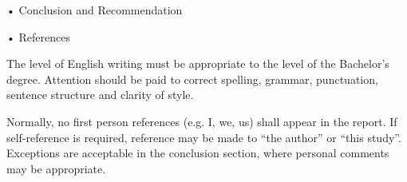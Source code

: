 \documentclass[12pt, a4paper]{report}
\begin{document}
{\begin{flushleft}
{				•	Conclusion and Recommendation
				
				•	References
				
				The level of English writing must be appropriate to the level of the Bachelor’s degree. Attention should be paid to correct spelling, grammar, punctuation, sentence structure and clarity of style.
				
				Normally, no first person references (e.g. I, we, us) shall appear in the report. If self-reference is required, reference may be made to “the author” or “this study”. Exceptions are acceptable in the conclusion section, where personal comments may be appropriate.
			}
		\end{flushleft}
	}
		
		
		
		
		
		
		
		
		
		
		
		
		
		
		
		
		
		
		
		\setcounter{chapter}{5}
		\setcounter{section}{0}
\end{document}
